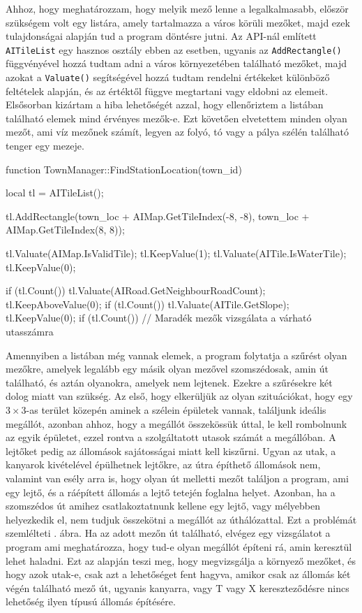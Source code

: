 Ahhoz, hogy meghatározzam, hogy melyik mező lenne a legalkalmasabb, először szükségem volt egy listára, amely tartalmazza a város körüli mezőket, majd ezek tulajdonságai alapján tud a program döntésre jutni. Az API-nál említett \texttt{AITileList} egy hasznos osztály ebben az esetben, ugyanis az \texttt{AddRectangle()} függvényével hozzá tudtam adni a város környezetében található mezőket, majd azokat a \texttt{Valuate()} segítségével hozzá tudtam rendelni értékeket különböző feltételek alapján, és az értéktől függve megtartani vagy eldobni az elemeit. Elsősorban kizártam a hiba lehetőségét azzal, hogy ellenőriztem a listában található elemek mind érvényes mezők-e. Ezt követően elvetettem minden olyan mezőt, ami víz mezőnek számít, legyen az folyó, tó vagy a pálya szélén található tenger egy mezeje.
\begin{cpp}
function TownManager::FindStationLocation(town_id) {
  local tl = AITileList();
  
  tl.AddRectangle(town_loc + AIMap.GetTileIndex(-8, -8),
   town_loc + AIMap.GetTileIndex(8, 8));
   
  tl.Valuate(AIMap.IsValidTile);
  tl.KeepValue(1);
  tl.Valuate(AITile.IsWaterTile);
  tl.KeepValue(0);
  
  if (tl.Count()) {
    tl.Valuate(AIRoad.GetNeighbourRoadCount);
  	tl.KeepAboveValue(0);
  	if (tl.Count()) {
      tl.Valuate(AITile.GetSlope);
      tl.KeepValue(0);
      if (tl.Count()) {
      	// Maradék mezők vizsgálata a várható utasszámra
      }
    }
  }
}
\end{cpp}
Amennyiben a listában még vannak elemek, a program folytatja a szűrést olyan mezőkre, amelyek legalább egy másik olyan mezővel szomszédosak, amin út található, és aztán olyanokra, amelyek nem lejtenek. Ezekre a szűrésekre két dolog miatt van szükség. Az első, hogy elkerüljük az olyan szituációkat, hogy egy $3 \times 3$-as terület közepén aminek a szélein épületek vannak, találjunk ideális megállót, azonban ahhoz, hogy a megállót összekössük úttal, le kell rombolnunk az egyik épületet, ezzel rontva a szolgáltatott utasok számát a megállóban. A lejtőket pedig az állomások sajátosságai miatt kell kiszűrni. Ugyan az utak, a kanyarok kivételével épülhetnek lejtőkre, az útra építhető állomások nem, valamint van esély arra is, hogy olyan út melletti mezőt találjon a program, ami egy lejtő, és a ráépített állomás a lejtő tetején foglalna helyet. Azonban, ha a szomszédos út amihez csatlakoztatnunk kellene egy lejtő, vagy mélyebben helyezkedik el, nem tudjuk összekötni a megállót az úthálózattal. Ezt a problémát szemlélteti . ábra. Ha az adott mezőn út található, elvégez egy vizsgálatot a program ami meghatározza, hogy tud-e olyan megállót építeni rá, amin keresztül lehet haladni. Ezt az alapján teszi meg, hogy megvizsgálja a környező mezőket, és hogy azok utak-e, csak azt a lehetőséget fent hagyva, amikor csak az állomás két végén található mező út, ugyanis kanyarra, vagy T vagy X kereszteződésre nincs lehetőség ilyen típusú állomás építésére.

